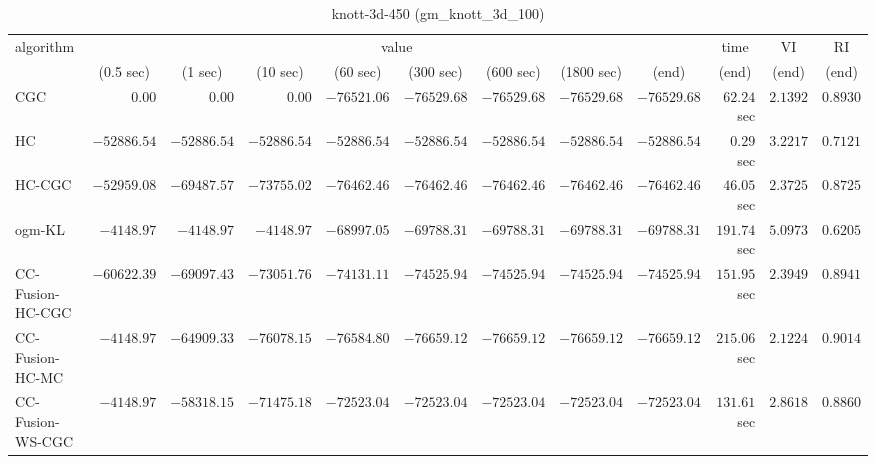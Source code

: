 \begin{table}[H]
\scriptsize
\centering
\caption{knott-3d-450 (gm\_knott\_3d\_100)}
\label{tab:anytimetable-knott-3d-450-gm-knott-3d-100}
\begin{tabular}{lrrrrrrrrrrr}
\toprule
           algorithm &                                   \multicolumn{8}{c}{value} & \multicolumn{1}{c}{time}    & \multicolumn{1}{c}{VI}  & \multicolumn{1}{c}{RI} \\  
\cmidrule(lr){2-9}\cmidrule(lr){10-10} \cmidrule(lr){11-11} \cmidrule(lr){12-12}   
                     & \multicolumn{1}{c}{(0.5 sec)} & \multicolumn{1}{c}{(1 sec)} & \multicolumn{1}{c}{(10 sec)} & \multicolumn{1}{c}{(60 sec)} & \multicolumn{1}{c}{(300 sec)} & \multicolumn{1}{c}{(600 sec)} & \multicolumn{1}{c}{(1800 sec)} & \multicolumn{1}{c}{(end)} & \multicolumn{1}{c}{(end)}    & \multicolumn{1}{c}{(end)}   & \multicolumn{1}{c}{(end)}  \\ \midrule 
                 CGC & $         0.00$ & $         0.00$ & $         0.00$ & $    -76521.06$ & $    -76529.68$ & $    -76529.68$ & $    -76529.68$ & $    -76529.68$ & $        62.24$ sec    & $       2.1392$  & $       0.8930$ \\ 
                  HC & $    -52886.54$ & $    -52886.54$ & $    -52886.54$ & $    -52886.54$ & $    -52886.54$ & $    -52886.54$ & $    -52886.54$ & $    -52886.54$ & $         0.29$ sec    & $       3.2217$  & $       0.7121$ \\ 
              HC-CGC & $    -52959.08$ & $    -69487.57$ & $    -73755.02$ & $    -76462.46$ & $    -76462.46$ & $    -76462.46$ & $    -76462.46$ & $    -76462.46$ & $        46.05$ sec    & $       2.3725$  & $       0.8725$ \\ 
              ogm-KL & $     -4148.97$ & $     -4148.97$ & $     -4148.97$ & $    -68997.05$ & $    -69788.31$ & $    -69788.31$ & $    -69788.31$ & $    -69788.31$ & $       191.74$ sec    & $       5.0973$  & $       0.6205$ \\ 
    CC-Fusion-HC-CGC & $    -60622.39$ & $    -69097.43$ & $    -73051.76$ & $    -74131.11$ & $    -74525.94$ & $    -74525.94$ & $    -74525.94$ & $    -74525.94$ & $       151.95$ sec    & $       2.3949$  & $       0.8941$ \\ 
     CC-Fusion-HC-MC & $     -4148.97$ & $    -64909.33$ & $    -76078.15$ & $    -76584.80$ & $    -76659.12$ & $    -76659.12$ & $    -76659.12$ & $    -76659.12$ & $       215.06$ sec    & $       2.1224$  & $       0.9014$ \\ 
    CC-Fusion-WS-CGC & $     -4148.97$ & $    -58318.15$ & $    -71475.18$ & $    -72523.04$ & $    -72523.04$ & $    -72523.04$ & $    -72523.04$ & $    -72523.04$ & $       131.61$ sec    & $       2.8618$  & $       0.8860$ \\ 

\end{tabular}
\end{table}
